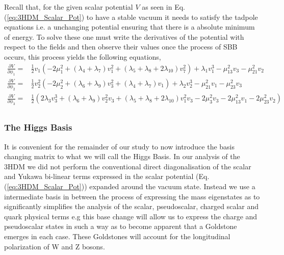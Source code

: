 \documentclass[10pt]{book}
\renewcommand{\(}{\left(}
\renewcommand{\)}{\right)}
\renewcommand{\[}{\left[}
\renewcommand{\]}{\right]}
\begin{document}
Recall that, for the given scalar potential $V$ as seen in Eq.\,(\ref{eq:3HDM_Scalar_Pot}) to have a stable vacuum it needs to satisfy the tadpole equations i.e. a unchanging potential ensuring that there is a absolute minimum of energy. 
%
To solve these one must write the derivatives of the potential with respect to the fields and then observe their values once the process of SBB occurs, this process yields the following equations,
%
\begin{equation}
\label{eq:3HDM_tadpoles}
\begin{split}
\frac{\partial V}{\partial \phi_1} = & \frac{1}{2} v_1 \left(-2 \mu _1^2+\left(\lambda _4+\lambda _7\right) v_1^2+\left(\lambda _5+\lambda _8+2 \lambda _{10}\right) v_7^2\right)+\lambda _1 v_1^3-\mu _{13}^2 v_3-\mu _{21}^2 v_2 \\ 
\frac{\partial V}{\partial \phi_2} = & \frac{1}{2} v_2^2 \left(-2 \mu _2^2+\left(\lambda _6+\lambda _9\right) v_3^2+\left(\lambda _4+\lambda _7\right) v_1\right)+\lambda _2 v_2^3-\mu _{21}^2 v_1-\mu _{23}^2 v_3 \\
\frac{\partial V}{\partial \phi_3} = & \frac{1}{2} \left(2 \lambda _3 v_3^3+\left(\lambda _6+\lambda _9\right) v_2^2 v_3+\left(\lambda _5+\lambda _8+2 \lambda _{10}\right) v_1^2 v_3-2 \mu _3^2 v_3-2 \mu _{13}^2 v_1-2 \mu _{23}^2 v_2\right) \\
\end{split} 
\end{equation}

\subsubsection{The Higgs Basis}

It is convenient for the remainder of our study to now introduce the basis changing matrix to what we will call the Higgs Basis.
%
In our analysis of the 3HDM we did not perform the conventional direct diagonalisation of the scalar and Yukawa bi-linear terms expressed in the scalar potential (Eq.\,(\ref{eq:3HDM_Scalar_Pot})) expanded around the vacuum state.
%
Instead we use a intermediate basis in between the process of expressing the mass eigenstates as to significantly simplifies the analysis of the scalar, pseudoscalar, charged scalar and quark physical terms 
%
%
e.g this base change will allow us to express the charge and pseudoscalar states in such a way as to become apparent that a Goldstone emerges in each case. 
%
These Goldstones will account for the longitudinal polarization of W and Z bosons. 
\end{document}
